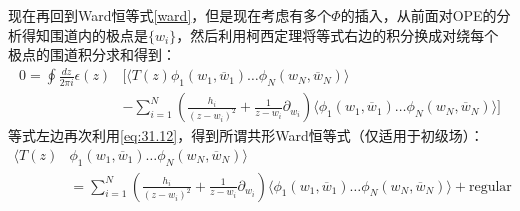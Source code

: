 现在再回到Ward恒等式\ref{ward}，但是现在考虑有多个$\Phi$的插入，从前面对OPE的分析得知围道内的极点是$\{w_i\}$，然后利用柯西定理将等式右边的积分换成对绕每个极点的围道积分求和得到：
\begin{equation}
	\begin{aligned}0=\oint\frac{dz}{2\pi i}\epsilon(z)&\Bigg[\Big\langle T(z)\phi_1(w_1,\overline{w}_1)\ldots\phi_N(w_N,\overline{w}_N)\Big\rangle\\
		&-\sum_{i=1}^N\left(\frac{h_i}{(z-w_i)^2}+\frac{1}{z-w_i}\partial_{w_i}\right)\Big\langle\phi_1(w_1,\overline{w}_1)\ldots\phi_N(w_N,\overline{w}_N)\Big\rangle\Bigg]\end{aligned}
\end{equation}
等式左边再次利用\ref{eq:31.12}，得到所谓共形Ward恒等式（仅适用于初级场）：
\begin{equation}\label{eq:31.17}
	\boxed{\begin{aligned}\big\langle T\left(z\right)&\phi_{1}(w_{1},\overline{w}_{1})\ldots\phi_{N}(w_{N},\overline{w}_{N})\big\rangle\\&=\sum_{i=1}^{N}\left(\frac{h_{i}}{(z-w_{i})^{2}}+\frac{1}{z-w_{i}}\partial_{w_{i}}\right)\Big\langle\phi_{1}(w_{1},\overline{w}_{1})\ldots\phi_{N}(w_{N},\overline{w}_{N})\Big\rangle+\text{regular}\end{aligned}}
\end{equation}
